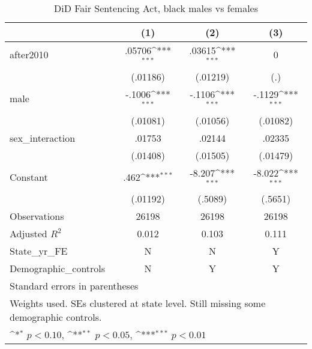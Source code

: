 \begin{table}[htbp]\centering
\def\sym#1{\ifmmode^{#1}\else\(^{#1}\)\fi}
\caption{DiD Fair Sentencing Act, black males vs females}
\begin{tabular}{l*{3}{c}}
\hline\hline
                    &\multicolumn{1}{c}{(1)}         &\multicolumn{1}{c}{(2)}         &\multicolumn{1}{c}{(3)}         \\
\hline
after2010           &      .05706\sym{***}&      .03615\sym{***}&           0         \\
                    &    (.01186)         &    (.01219)         &         (.)         \\
[1em]
male                &      -.1006\sym{***}&      -.1106\sym{***}&      -.1129\sym{***}\\
                    &    (.01081)         &    (.01056)         &    (.01082)         \\
[1em]
sex\_interaction     &      .01753         &      .02144         &      .02335         \\
                    &    (.01408)         &    (.01505)         &    (.01479)         \\
[1em]
Constant            &        .462\sym{***}&      -8.207\sym{***}&      -8.022\sym{***}\\
                    &    (.01192)         &     (.5089)         &     (.5651)         \\
\hline
Observations        &       26198         &       26198         &       26198         \\
Adjusted \(R^{2}\)  &       0.012         &       0.103         &       0.111         \\
State\_yr\_FE         &           N         &           N         &           Y         \\
Demographic\_controls&           N         &           Y         &           Y         \\
\hline\hline
\multicolumn{4}{l}{\footnotesize Standard errors in parentheses}\\
\multicolumn{4}{l}{\footnotesize Weights used. SEs clustered at state level. Still missing some demographic controls.}\\
\multicolumn{4}{l}{\footnotesize \sym{*} \(p<0.10\), \sym{**} \(p<0.05\), \sym{***} \(p<0.01\)}\\
\end{tabular}
\end{table}
